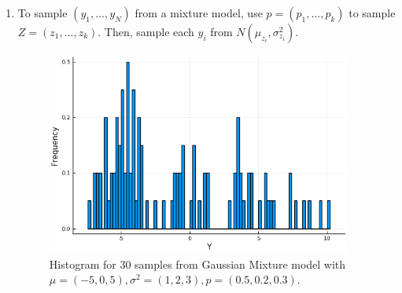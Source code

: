 \documentclass[12pt,letterpaper]{article}
\begin{document}
\begin{enumerate}[leftmargin=!,labelindent=5pt]
\item To sample $(y_1,...,y_N)$ from a mixture model,
use $p = (p_1,...,p_k)$ to sample $Z = (z_1,...,z_k)$. Then,
sample each $y_i$ from $N(\mu_{z_i},\sigma^2_{z_i})$.
\begin{figure}[H]
    \centering
    \includegraphics[width=10cm]{images/Ex6.png}
    \caption{Histogram for 30 samples from
    Gaussian Mixture model with
    $\mu = (-5, 0, 5),\sigma^2 =(1,2,3), p = (0.5,0.2,0.3)$.
    }
    \label{fig:1}
\end{figure}


\end{enumerate}
\end{document}
